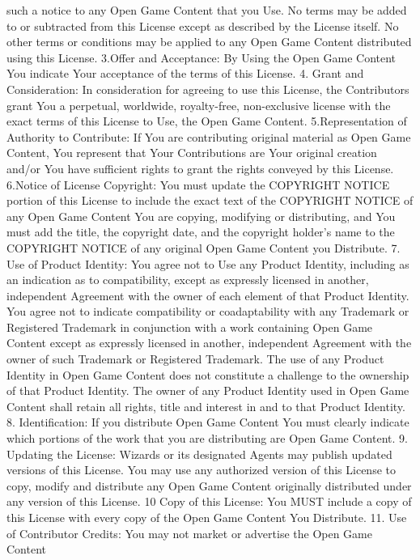 \begin{multicols}{2}
such a notice to any Open Game Content that
you Use. No terms may be added to or
subtracted from this License except as described
by the License itself. No other terms or conditions
may be applied to any Open Game Content
distributed using this License.
3.Offer and Acceptance: By Using the Open Game
Content You indicate Your acceptance of the
terms of this License.
4. Grant and Consideration: In consideration for
agreeing to use this License, the Contributors
grant You a perpetual, worldwide, royalty-free,
non-exclusive license with the exact terms of this
License to Use, the Open Game Content.
5.Representation of Authority to Contribute: If
You are contributing original material as Open
Game Content, You represent that Your
Contributions are Your original creation and/or
You have sufficient rights to grant the rights
conveyed by this License.
6.Notice of License Copyright: You must update
the COPYRIGHT NOTICE portion of this License to
include the exact text of the COPYRIGHT NOTICE
of any Open Game Content You are copying,
modifying or distributing, and You must add the
title, the copyright date, and the copyright 
holder's name to the COPYRIGHT NOTICE of any
original Open Game Content you Distribute.
7. Use of Product Identity: You agree not to Use
any Product Identity, including as an indication as
to compatibility, except as expressly licensed in
another, independent Agreement with the owner
of each element of that Product Identity. You
agree not to indicate compatibility or coadaptability with any Trademark or Registered
Trademark in conjunction with a work containing
Open Game Content except as expressly licensed
in another, independent Agreement with the
owner of such Trademark or Registered
Trademark. The use of any Product Identity in
Open Game Content does not constitute a
challenge to the ownership of that Product
Identity. The owner of any Product Identity used
in Open Game Content shall retain all rights, title
and interest in and to that Product Identity.
8. Identification: If you distribute Open Game
Content You must clearly indicate which portions
of the work that you are distributing are Open
Game Content.
9. Updating the License: Wizards or its designated
Agents may publish updated versions of this
License. You may use any authorized version of
this License to copy, modify and distribute any
Open Game Content originally distributed under
any version of this License.
10 Copy of this License: You MUST include a copy
of this License with every copy of the Open Game
Content You Distribute.
11. Use of Contributor Credits: You may not
market or advertise the Open Game Content

\end{multicols}
